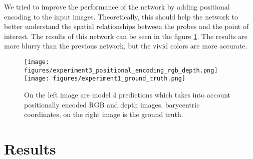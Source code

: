 We tried to improve the performance of the network by adding positional encoding to the input images. Theoretically, this should help the network to better understand the spatial relationships between the probes and the point of interest.
The results of this network can be seen in the figure \ref{fig:neural_network_4}. The results are more blurry than the previous network, but the vivid colors are more accurate.

\begin{figure}[htb]
    \centering
    \texttt{[image: figures/experiment3\_positional\_encoding\_rgb\_depth.png]}
    \texttt{[image: figures/experiment1\_ground\_truth.png]}

    \caption{On the left image are model 4 predictions which takes into account positionally encoded RGB and depth images, barycentric coordinates, on the right image is the ground truth.}
    \label{fig:neural_network_4}
\end{figure}


\section{Results}

